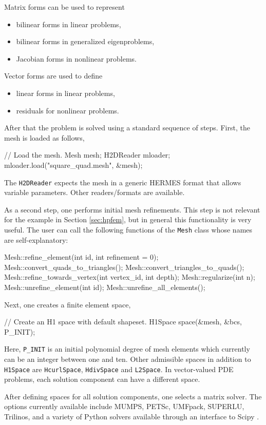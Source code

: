 \documentclass[final,3p,times,twocolumn]{elsarticle}
\begin{document}
Matrix forms can be used to represent 
\begin{itemize}
\item bilinear forms in linear problems, 
\item bilinear forms in generalized eigenproblems,
\item Jacobian forms in nonlinear problems.
\end{itemize}
Vector forms are used to define

\begin{itemize}
\item linear forms in linear problems,
\item residuals for nonlinear problems.
\end{itemize}
After that the problem 
is solved using a standard sequence 
of steps. First, the mesh is loaded
as follows,

\begin{code}
  // Load the mesh.
  Mesh mesh;
  H2DReader mloader;
  mloader.load("square_quad.mesh", &mesh);
\end{code}
The {\tt H2DReader} expects the mesh in a generic
HERMES format that allows variable parameters. 
Other readers/formats are available. 

As a second step, one performs initial mesh refinements. This
step is not relevant for the example in Section 
\ref{sec:hpfem}, but in general this functionality 
is very useful. The user can call the following 
functions of the {\tt Mesh} class whose names are 
self-explanatory:

\begin{code}
Mesh::refine_element(int id, int refinement = 0);
Mesh::convert_quads_to_triangles();
Mesh::convert_triangles_to_quads();
Mesh::refine_towards_vertex(int vertex_id, int depth);
Mesh::regularize(int n);
Mesh::unrefine_element(int id);
Mesh::unrefine_all_elements();
\end{code}
Next, one creates a finite element space,
\begin{code}
  // Create an H1 space with default shapeset.
  H1Space space(&mesh, &bcs, P_INIT);
\end{code}
Here, {\tt P\_INIT} is an initial polynomial degree 
of mesh elements which currently can be an integer
between one and ten. Other admissible spaces in
addition to {\tt H1Space} are {\tt HcurlSpace},
{\tt HdivSpace} and {\tt L2Space}. In vector-valued
PDE problems, each solution component can have 
a different space.

After defining spaces for all solution components, 
one selects a matrix solver. The options 
currently available include MUMPS, PETSc, UMFpack, SUPERLU, 
Trilinos, and a variety of Python solvers available through 
an interface to Scipy \cite{scipy}. 
\end{document}
